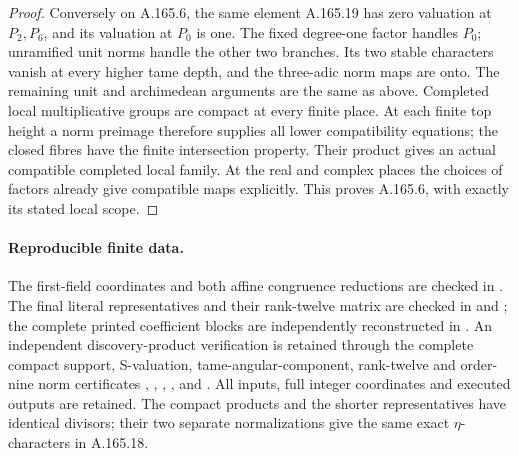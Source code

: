 \begin{proof}
Conversely on A.165.6, the same element A.165.19 has zero valuation
at \(P_2,P_6\), and its valuation at \(P_0\) is one.
The fixed degree-one factor handles \(P_0\); unramified unit norms
handle the other two branches.  Its two stable characters vanish
at every higher tame depth, and the three-adic norm maps are onto.
The remaining unit and archimedean arguments are the same as above.
Completed local multiplicative groups are compact at every finite
place.  At each finite top height a norm preimage therefore supplies
all lower compatibility equations; the closed fibres have the finite
intersection property.  Their product gives an actual compatible
completed local family.  At the real and complex places the choices
of factors already give compatible maps explicitly.
This proves A.165.6, with exactly its stated local scope.
\end{proof}

\paragraph{Reproducible finite data.}
The first-field coordinates and both affine congruence reductions are
checked in .
The final literal representatives and their rank-twelve matrix are
checked in
 and
;
the complete printed coefficient blocks are independently reconstructed
in .
An independent discovery-product verification is retained through the
complete compact support, S-valuation, tame-angular-component,
rank-twelve and order-nine norm certificates
,
,
,
, and
.
All inputs, full integer coordinates and executed outputs are retained.
The compact products and the shorter representatives have identical
divisors; their two separate normalizations give the same exact
\(\eta\)-characters in A.165.18.


